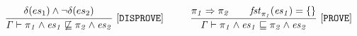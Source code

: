  \begin{gather*}
\frac{
\begin{matrix}
\text{\codeme{\delta(\es_1) \wedge \neg \delta(\es_2) }}
\end{matrix}
}{\text{\code{\Gamma  \vdash  \pi_1 \wedge \es_1 \not\CONTAIN  \pi_2 \wedge \es_2 }}}\ \codeme{  [DISPROVE]} 
\qquad\ \ 
\frac{
\begin{matrix}
\text{\code{\pi_1 \Rightarrow \pi_2 \quad\ \  
\m{fst}_{\pi_1}(\es_1) = \{\}
}}
\end{matrix}
}{\text{\code{\Gamma   \vdash  \pi_1 \wedge \es_1 \CONTAIN  \pi_2 \wedge \es_2 }}}\ \codeme{  [PROVE]} 
\end{gather*}